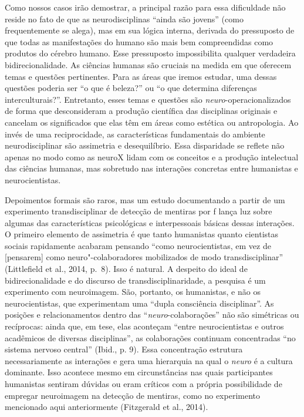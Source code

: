 Como nossos casos irão demostrar, a principal razão para essa
dificuldade não reside no fato de que as neurodisciplinas ``ainda são
jovens'' (como frequentemente se alega), mas em sua lógica interna,
derivada do pressuposto de que todas as manifestações do humano são
mais bem compreendidas como produtos do cérebro humano. Esse pressuposto
impossibilita qualquer verdadeira bidirecionalidade. As ciências humanas
são cruciais na medida em que oferecem temas e questões pertinentes.
Para as áreas que iremos estudar, uma dessas questões poderia ser ``o
que é beleza?'' ou ``o que determina diferenças interculturais?''.
Entretanto, esses temas e questões são \emph{neuro}-operacionalizados de
forma que desconsideram a produção científica das disciplinas originais
e cancelam os significados que elas têm em áreas como estética ou
antropologia. Ao invés de uma reciprocidade, as características
fundamentais do ambiente neurodisciplinar são assimetria e
desequilíbrio. Essa disparidade se reflete não apenas no modo como as
neuroX lidam com os conceitos e a produção intelectual das ciências
humanas, mas sobretudo nas interações concretas entre humanistas e
neurocientistas.

Depoimentos formais são raros, mas um estudo documentando a partir de um
experimento transdisciplinar de detecção de mentiras por f lança luz
sobre algumas das características psicológicas e interpessoais básicas
dessas interações. O primeiro elemento de assimetria é que tanto
humanistas quanto cientistas sociais rapidamente acabaram pensando
``como neurocientistas, em vez de {[}pensarem{]} como
neuro"-colaboradores mobilizados de modo transdisciplinar'' (Littlefield
et al., 2014, p.~8). Isso é natural. A despeito do ideal de
bidirecionalidade e do discurso de transdisciplinaridade, a pesquisa é
um experimento com neuroimagem. São, portanto, os humanistas, e não os
neurocientistas, que experimentam uma ``dupla consciência disciplinar''.
As posições e relacionamentos dentro das ``\emph{neuro}-colaborações''
não são simétricas ou recíprocas: ainda que, em tese, elas aconteçam
``entre neurocientistas e outros acadêmicos de diversas disciplinas'',
as colaborações continuam concentradas ``no sistema nervoso central''
(Ibid., p. 9). Essa concentração estrutura necessariamente as interações
e gera uma hierarquia na qual o \emph{neuro} é a cultura dominante. Isso
acontece mesmo em circunstâncias nas quais participantes humanistas
sentiram dúvidas ou eram críticos com a própria possibilidade de
empregar neuroimagem na detecção de mentiras, como no experimento
mencionado aqui anteriormente (Fitzgerald et al., 2014).

